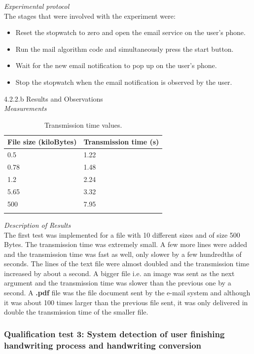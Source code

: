 \textit{Experimental protocol}\\
The stages that were involved with the experiment were:
\begin{itemize}
	\item Reset the stopwatch to zero and open the email service on the user's phone.
	\item Run the mail algorithm code and simultaneously press the start button.
	\item Wait for the new email notification to pop up on the user's phone.
	\item  Stop the stopwatch when the email notification is observed by the user.
\end{itemize}

4.2.2.b Results and Observations\\
\textit{Measurements}\\
\begin{center}
	\begin{longtable}{|p{5cm}|p{5cm}|}
		\hline
		\textbf{File size (kiloBytes)} &
		\textbf{Transmission time (s)} \\
		\hline
		0.5
		&
		1.22
		\\
		\hline
		0.78
		&
		1.48
		\\
		\hline
		1.2
		&
		2.24
		\\
		\hline
		5.65
		&
		3.32
		\\
		\hline
		500
		&
		7.95
		\\
		\hline		
		\caption{Transmission time values.}
	\end{longtable}
\end{center}

\textit{Description of Results}\\
The first test was implemented for a file with 10 different sizes and of size 500 Bytes. The transmission time was extremely small. A few more lines were added and the transmission time was fast as well, only slower by a few hundredths of seconds. The lines of the text file were almost doubled and the transmission time increased by about a second. A bigger file i.e. an image was sent as the next argument and the transmission time was slower than the previous one by a second. A \textbf{.pdf} file was the file document sent by the e-mail system and although it was about 100 times larger than the previous file sent, it was only delivered in double the transmission time of the smaller file.

\subsubsection{Qualification test 3: System detection of user finishing handwriting process and handwriting conversion}

